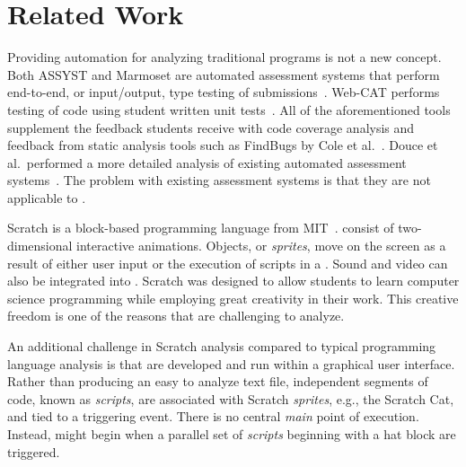 \section{Related Work}

Providing automation for analyzing traditional programs is not a new concept.
Both ASSYST and Marmoset are automated assessment systems that perform
end-to-end, or input/output, type testing of
submissions~\cite{Spacco:2006:EMD:1140124.1140131,
  Jackson:1997:GSP:268084.268210}. Web-CAT performs testing of code using
student written unit tests~\cite{Edwards:2003:RCS:949344.949390}. All of the
aforementioned tools supplement the feedback students receive with code
coverage analysis and feedback from static analysis tools such as FindBugs by
Cole et al.~\cite{Cole:2006:IYS:1176617.1176667}. Douce et al.\ performed a
more detailed analysis of existing automated assessment
systems~\cite{Douce:2005:ATA:1163405.1163409}.  The problem with existing
assessment systems is that they are not applicable to .

Scratch is a block-based programming language from
MIT~\cite{Maloney:2010:SPL:1868358.1868363}.   consist of
two-dimensional interactive animations.  Objects, or \emph{sprites}, move on
the screen as a result of either user input or the execution of scripts in a
\sprogram{}.  Sound and video can also be integrated into .
Scratch was designed to allow students to learn computer science programming
while employing great creativity in their work.  This creative freedom is one
of the reasons that  are challenging to analyze.

An additional challenge in Scratch analysis compared to typical programming
language analysis is that  are developed and run within a graphical
user interface. Rather than producing an easy to analyze text file, independent
segments of code, known as \emph{scripts}, are associated with Scratch
\emph{sprites}, e.g., the Scratch Cat, and tied to a triggering event.  There
is no central \emph{main} point of execution.  Instead,  might
begin when a parallel set of \emph{scripts} beginning with a \greenflag{} hat
block are triggered.

